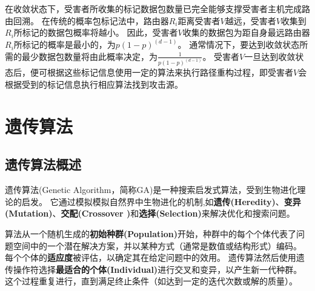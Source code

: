 在收敛状态下，受害者所收集的标记数据包数量已完全能够支撑受害者主机完成路由回溯。
在传统的概率包标记法中，路由器$R_i$距离受害者$V$越远，受害者$V$收集到$R_i$所标记的数据包概率将越小。
因此，受害者$V$收集的数据包为距自身最远路由器$R_i$所标记的概率是最小的，为$p(1-p)^(d-1)$。
通常情况下，要达到收敛状态所需的最少数据包数量将由此概率决定，为$\frac{1}{p(1-p)^(d-1)}$。
受害者$V$一旦达到收敛状态后，便可根据这些标记信息使用一定的算法来执行路径重构过程，即受害者$V$会根据受到的标记信息执行相应算法找到攻击源。

\section{遗传算法\cite{zhou2006matlab}}
\subsection{遗传算法概述}
遗传算法(Genetic Algorithm，简称GA)是一种搜索启发式算法，受到生物进化理论的启发。
它通过模拟模拟自然界中生物进化的机制,如\textbf{遗传(Heredity)}、\textbf{变异(Mutation)}、\textbf{交配(Crossover )}和\textbf{选择(Selection)}来解决优化和搜索问题。


算法从一个随机生成的\textbf{初始种群(Population)}开始，种群中的每个个体代表了问题空间中的一个潜在解决方案，并以某种方式（通常是数值或结构形式）编码。
每个个体的\textbf{适应度}被评估，以确定其在给定问题中的效用。
遗传算法然后使用遗传操作符选择\textbf{最适合的个体(Individual)}进行交叉和变异，以产生新一代种群。
这个过程重复进行，直到满足终止条件（如达到一定的迭代次数或解的质量）。


